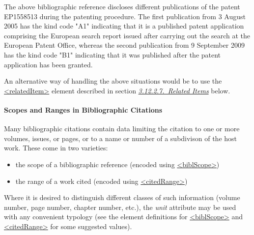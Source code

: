 The above bibliographic reference discloses different publications of the patent EP1558513 during the patenting procedure. The first publication from 3 August 2005 has the kind code "A1" indicating that it is a published patent application comprising the European search report issued after carrying out the search at the European Patent Office, whereas the second publication from 9 September 2009 has the kind code "B1" indicating that it was published after the patent application has been granted.\par
An alternative way of handling the above situations would be to use the \hyperref[TEI.relatedItem]{<relatedItem>} element described in section \textit{\hyperref[COBIRI]{3.12.2.7.\ Related Items}} below.
\paragraph[{Scopes and Ranges in Bibliographic Citations}]{Scopes and Ranges in Bibliographic Citations}\label{COBICOB}\par
Many bibliographic citations contain data limiting the citation to one or more volumes, issues, or pages, or to a name or number of a subdivison of the host work. These come in two varieties: \begin{itemize}
\item the scope of a bibliographic reference (encoded using \hyperref[TEI.biblScope]{<biblScope>})
\item the range of a work cited (encoded using \hyperref[TEI.citedRange]{<citedRange>})
\end{itemize}  Where it is desired to distinguish different classes of such information (volume number, page number, chapter number, etc.), the {\itshape unit} attribute may be used with any convenient typology (see the element definitions for \hyperref[TEI.biblScope]{<biblScope>} and \hyperref[TEI.citedRange]{<citedRange>} for some suggested values).\par

